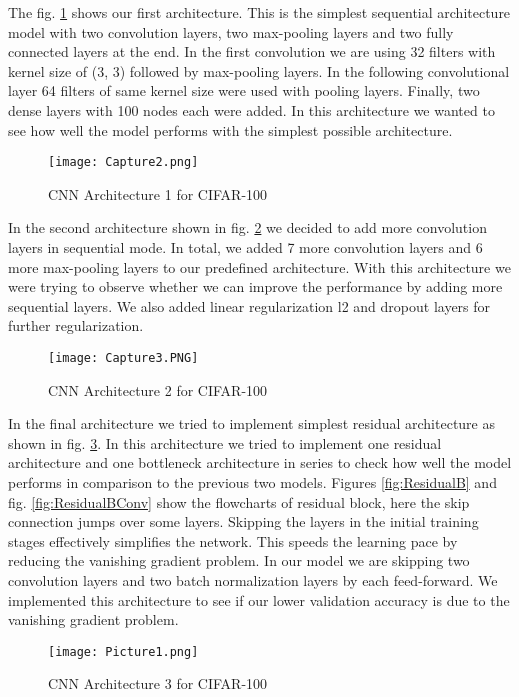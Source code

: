 \documentclass{article}
\begin{document}
The fig. \ref{fig:Cifar100A1} shows our first architecture. This is the simplest sequential architecture model with two convolution layers, two max-pooling layers and two fully connected layers at the end. In the first convolution we are using 32 filters with kernel size of (3, 3) followed by max-pooling layers. In the following convolutional layer 64 filters of same kernel size were used with pooling layers. Finally, two dense layers with 100 nodes each were added. In this architecture we wanted to see how well the model performs with the simplest possible architecture.

\begin{figure}[H]
    \centering
    \texttt{[image: Capture2.png]}
    \caption{CNN Architecture 1 for CIFAR-100}
    \label{fig:Cifar100A1}
\end{figure}

In the second architecture shown in fig. \ref{fig:Cifar100A2} we decided to add more convolution layers in sequential mode. In total, we added 7 more convolution layers and 6 more max-pooling layers to our predefined architecture. With this architecture we were trying to observe whether we can improve the performance by adding more sequential layers. We also added linear regularization l2 and dropout layers for further regularization.

\begin{figure}[H]
    \centering
    \texttt{[image: Capture3.PNG]}
    \caption{CNN Architecture 2 for CIFAR-100}
    \label{fig:Cifar100A2}
\end{figure}

In the final architecture we tried to implement simplest residual architecture as shown in fig. \ref{fig:Cifar100A3}. In this architecture we tried to implement one residual architecture and one bottleneck architecture in series to check how well the model performs in comparison to the previous two models. Figures \ref{fig:ResidualB} and fig. \ref{fig:ResidualBConv} show the flowcharts of residual block, here the skip connection jumps over some layers. Skipping the layers in the initial training stages effectively simplifies the network. This speeds the learning pace by reducing the vanishing gradient problem. In our model we are skipping two convolution layers and two batch normalization layers by each feed-forward. We implemented this architecture to see if our lower validation accuracy is due to the vanishing gradient problem.

\begin{figure}[H]
    \centering
    \texttt{[image: Picture1.png]}
    \caption{CNN Architecture 3 for CIFAR-100}
    \label{fig:Cifar100A3}
\end{figure}
\end{document}
